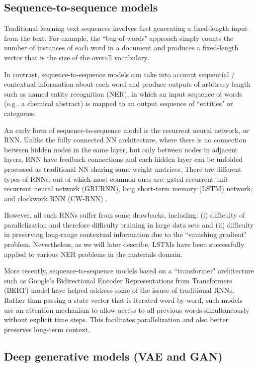 \documentclass[pdflatex,sn-mathphys]{sn-jnl}%
\theoremstyle{thmstyleone}%
\theoremstyle{thmstyletwo}%
\theoremstyle{thmstylethree}%
\begin{document}
\subsection{Sequence-to-sequence models}\label{sec:sequence}

Traditional learning text sequences involves first generating a fixed-length input from the text. For example, the ``bag-of-words" approach simply counts the number of instances of each word in a document and produces a fixed-length vector that is the size of the overall vocabulary.

In contrast, sequence-to-sequence models can take into account sequential / contextual information about each word and produce outputs of arbitrary length such as named entity recognition (NER), in which an input sequence of words (e.g., a chemical abstract) is mapped to an output sequence of ``entities" or categories. 

An early form of sequence-to-sequence model is the recurrent neural network, or RNN. Unlike the fully connected NN architecture, where there is no connection between hidden nodes in the same layer, but only between nodes in adjacent layers, RNN have feedback connections and each hidden layer can be unfolded processed as traditional NN sharing same weight matrices. There are different types of RNNs, out of which most common ones are: gated recurrent unit recurrent neural network (GRURNN), long short-term memory (LSTM) network, and clockwork RNN (CW-RNN) \cite{jing2018deep}. 

However, all such RNNs suffer from some drawbacks, including: (i) difficulty of parallelization and therefore difficulty training in large data sets and (ii) difficulty in preserving long-range contextual information due to the ``vanishing gradient" problem. Nevertheless, as we will later describe, LSTMs have been successfully applied to various NER problems in the materials domain.

More recently, sequence-to-sequence models based on a ``transformer" architecture such as Google's Bidirectional Encoder Representations from Transformers (BERT) model \cite{devlin2018bert,nistdisclaimer} have helped address some of the issues of traditional RNNs. Rather than passing a state vector that is iterated word-by-word, such models use an attention mechanism to allow access to all previous words simultaneously without explicit time steps. This facilitates parallelization and also better preserves long-term context. 

\subsection{Deep generative models (VAE and GAN)}\label{sec:generative}
\end{document}
